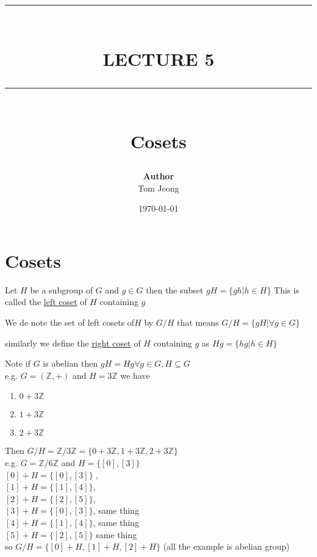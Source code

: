 \documentclass{article}
\newcommand{\HRule}[1]{\rule{\linewidth}{#1}}
\begin{document}

\title{ \normalsize \textsc{}
		\\ [2.0cm]
		\HRule{1.5pt} \\
		\LARGE \textbf{\uppercase{Lecture 5 }}
		\HRule{2.0pt} \\ [0.6cm] \LARGE{Cosets}
		}

\date{\today}
\author{\textbf{Author} \\ 
		Tom Jeong
        }

\maketitle
\newpage

\tableofcontents
\newpage

\section{Cosets}
\begin{definition}
    Let $H$ be a subgroup of $G$ and $g \in G$ then the subset $gH = \{gh | h \in H \}$ This is called the \underline{left coset} of $H$ containing $g$
\end{definition}
We de note the set of left cosets of$H$ by $G / H$  that means $G / H = \{gH |\forall  g \in G \}$
\begin{definition}
similarly we define the \underline{right coset} of $H$ containing $g$ as $Hg = \{hg | h \in H \}$
\end{definition}

Note if $G$ is abelian then $gH = Hg   \forall g \in G, H \subseteq G$ \\
e.g. $G = (\mathbb{Z}, +)$ and $H = 3\mathbb{Z}$ we have
\begin{enumerate}
    \item $0 + 3\mathbb{Z}$
    \item $1 + 3\mathbb{Z}$
    \item $2 + 3\mathbb{Z}$
    
\end{enumerate} Then $G / H = \mathbb{Z} / 3\mathbb{Z} = \{0 + 3\mathbb{Z}, 1 + 3\mathbb{Z}, 2 + 3\mathbb{Z} \}$
\\ 
e.g. $G = \mathbb{Z} / 6\mathbb{Z}$ and $H = \{[0], [3] \}$ \\ 
$[0] + H = \{[0], [3] \}$ , 
\\ $[1] + H = \{[1], [4] \}$,  
\\$[2] + H = \{[2], [5] \}$,  
\\ $[3] + H = \{[0], [3] \}$, same thing \\  
$[4] + H = \{[1], [4] \}$, same thing \\ 
 $[5] + H = \{[2], [5] \}$ same thing \\ so 
 $G / H = \{[0] + H, [1] + H, [2] + H \}$ (all the example is abelian group)  \\
\end{document}
